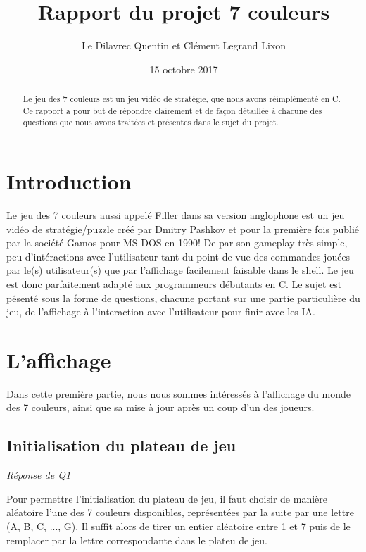 \documentclass[a4paper,11pt]{article}
\begin{document}
\title{Rapport du projet 7 couleurs}

\author{Le Dilavrec Quentin et Clément Legrand Lixon}

\date{15 octobre 2017}

\maketitle

\begin{abstract}
Le jeu des 7 couleurs est un jeu vidéo de stratégie, que nous avons réimplémenté en C. Ce rapport a pour but de répondre 
clairement et de façon détaillée à chacune des questions  que nous avons
traitées et présentes dans le sujet du projet.
\end{abstract}


\section{Introduction}
Le jeu des 7 couleurs aussi appelé Filler dans sa version anglophone est 
un jeu vidéo de stratégie/puzzle créé par Dmitry Pashkov et pour la première 
fois publié par la société Gamos pour MS-DOS en 1990! De par son gameplay 
très simple, peu d'intéractions avec l'utilisateur tant du point de vue des commandes 
jouées par le(s) utilisateur(s) que par l'affichage facilement faisable dans le shell. 
Le jeu est donc parfaitement adapté aux programmeurs débutants en C. Le sujet est 
pésenté sous la forme de questions, chacune portant sur une partie particulière du jeu, 
de l'affichage à l'interaction avec l'utilisateur pour finir avec les IA.


\section{L'affichage}

Dans cette première partie, nous nous sommes intéressés à l'affichage
du monde des 7 couleurs, ainsi que sa mise à jour après un coup d'un des
joueurs.

\subsection{Initialisation du plateau de jeu}
\emph{Réponse de Q1}

Pour permettre l'initialisation du plateau de jeu, il faut choisir de manière aléatoire l'une des 7 couleurs disponibles, représentées par la suite par une lettre (A, B, C, ..., G). Il suffit alors de tirer un entier aléatoire entre 1 et 7 puis de le remplacer par la lettre correspondante dans le plateu de jeu. 
\end{document}
